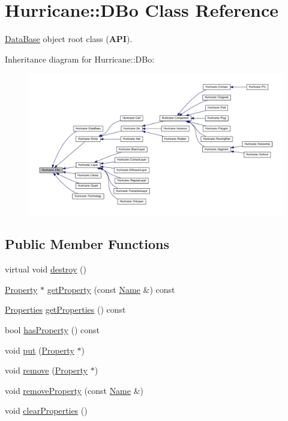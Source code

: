 \hypertarget{classHurricane_1_1DBo}{}\section{Hurricane\+:\+:D\+Bo Class Reference}
\label{classHurricane_1_1DBo}


\hyperlink{classHurricane_1_1DataBase}{Data\+Base} object root class ({\bfseries A\+PI}).  




Inheritance diagram for Hurricane\+:\+:D\+Bo\+:\nopagebreak
\begin{figure}[H]
\begin{center}
\leavevmode
\includegraphics[width=350pt]{classHurricane_1_1DBo__inherit__graph}
\end{center}
\end{figure}
\subsection*{Public Member Functions}
\begin{DoxyCompactItemize}
\item 
virtual void \hyperlink{classHurricane_1_1DBo_a67febf5bf9c8b322674648688639728b}{destroy} ()
\item 
\hyperlink{classHurricane_1_1Property}{Property} $\ast$ \hyperlink{classHurricane_1_1DBo_a599f61978df51d1d4c351f6cbd02488d}{get\+Property} (const \hyperlink{classHurricane_1_1Name}{Name} \&) const
\item 
\hyperlink{namespaceHurricane_afd7bca6dad4be54b7c03b0463e6c0004}{Properties} \hyperlink{classHurricane_1_1DBo_aec46894a10e83abb54c495dc4d90f2d3}{get\+Properties} () const
\item 
bool \hyperlink{classHurricane_1_1DBo_a1563f094565030c77592ed82f9a9989b}{has\+Property} () const
\item 
void \hyperlink{classHurricane_1_1DBo_a8979674f11507cb4c7c5251b41ed72d5}{put} (\hyperlink{classHurricane_1_1Property}{Property} $\ast$)
\item 
void \hyperlink{classHurricane_1_1DBo_a7833a1f0b8c704930bdc00861e63cf5e}{remove} (\hyperlink{classHurricane_1_1Property}{Property} $\ast$)
\item 
void \hyperlink{classHurricane_1_1DBo_ac35fbb8303b1a78db5ca0fc831fb6a0c}{remove\+Property} (const \hyperlink{classHurricane_1_1Name}{Name} \&)
\item 
void \hyperlink{classHurricane_1_1DBo_a3e02f3d665cb0b2120df2fdfe9c3df4f}{clear\+Properties} ()
\end{DoxyCompactItemize}


